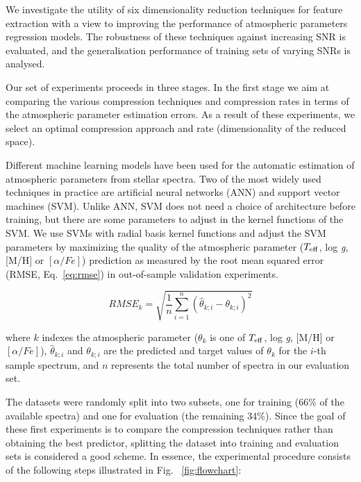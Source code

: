\documentclass[a4paper,fleqn,usenatbib]{mnras}
\begin{document}
{{{We investigate the utility of six dimensionality reduction techniques
for feature extraction with a view to improving the performance of
atmospheric parameters regression models. The robustness of these
techniques against increasing SNR is evaluated, and the generalisation
performance of training sets of varying SNRs is analysed.

Our set of experiments proceeds in three stages. In the first stage we
aim at comparing the various compression techniques and compression
rates in terms of the atmospheric parameter estimation errors. As a
result of these experiments, we select an optimal compression approach
and rate (dimensionality of the reduced space).

Different machine learning models have been used for the automatic
estimation of atmospheric parameters from stellar spectra. Two of the
most widely used techniques in practice are artificial neural networks
(ANN) and support vector machines (SVM). Unlike ANN, SVM does not need
a choice of architecture before training, but there are some
parameters to adjust in the kernel functions of the SVM. We use SVMs
with radial basis kernel functions and adjust the SVM parameters by
maximizing the quality of the atmospheric parameter ($T_{\rm eff}$,
log \textit{g}, [M/H] or $\left[ \alpha/Fe \right]$) prediction as 
measured by the root mean squared error (RMSE, Eq.~\ref{eq:rmse}) 
in out-of-sample validation experiments.

\begin{equation}
\label{eq:rmse}
RMSE_k=\sqrt{\frac{1}{n}\sum_{i=1}^{n}\left(\hat{\theta}_{k;i}-\theta_{k;i}\right)^{2}}
\end{equation}

where $k$ indexes the atmospheric parameter 
	(${\theta}_{k}$ is one of $T_{\rm eff}$, log \textit{g}, 
	[M/H] or $\left[ \alpha/Fe \right]$), $\hat{\theta}_{k;i}$ and $\theta_{k;i}$
	are the predicted and target values of ${\theta}_{k}$ for the $i$-th 
	sample spectrum, and $n$ represents the total number of spectra in our evaluation set.
  
The datasets were randomly split into two subsets, one for training
(66\% of the available spectra) and one for evaluation (the remaining
34\%). Since the goal of these first experiments is to compare the
compression techniques rather than obtaining the best predictor,
splitting the dataset into training and evaluation sets is considered
a good scheme. In essence, the experimental procedure consists of the
following steps illustrated in Fig.~ \ref{fig:flowchart}:

}}}
\end{document}
